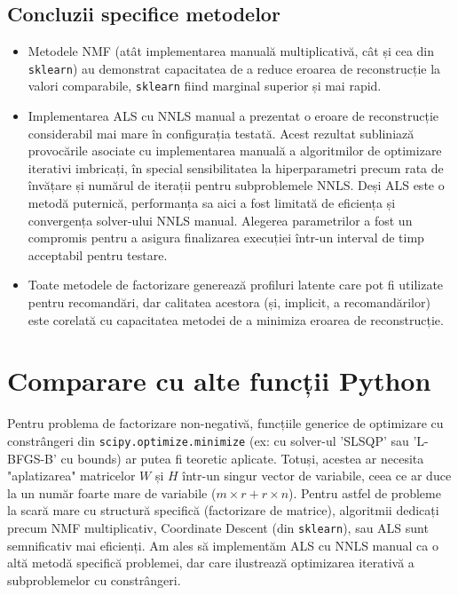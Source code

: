 \documentclass[12pt,a4paper]{article}
\begin{document}
\subsection{Concluzii specifice metodelor}
\begin{itemize}
	\item Metodele NMF (atât implementarea manuală multiplicativă, cât și cea din \texttt{sklearn}) au demonstrat capacitatea de a reduce eroarea de reconstrucție la valori comparabile, \texttt{sklearn} fiind marginal superior și mai rapid.
	\item Implementarea ALS cu NNLS manual a prezentat o eroare de reconstrucție considerabil mai mare în configurația testată. Acest rezultat subliniază provocările asociate cu implementarea manuală a algoritmilor de optimizare iterativi imbricați, în special sensibilitatea la hiperparametri precum rata de învățare și numărul de iterații pentru subproblemele NNLS. Deși ALS este o metodă puternică, performanța sa aici a fost limitată de eficiența și convergența solver-ului NNLS manual. Alegerea parametrilor a fost un compromis pentru a asigura finalizarea execuției într-un interval de timp acceptabil pentru testare.
	\item Toate metodele de factorizare generează profiluri latente care pot fi utilizate pentru recomandări, dar calitatea acestora (și, implicit, a recomandărilor) este corelată cu capacitatea metodei de a minimiza eroarea de reconstrucție.
\end{itemize}

\section{Comparare cu alte funcții Python}
Pentru problema de factorizare non-negativă, funcțiile generice de optimizare cu constrângeri din \texttt{scipy.optimize.minimize} (ex: cu solver-ul 'SLSQP' sau 'L-BFGS-B' cu bounds) ar putea fi teoretic aplicate. Totuși, acestea ar necesita "aplatizarea" matricelor $W$ și $H$ într-un singur vector de variabile, ceea ce ar duce la un număr foarte mare de variabile ($m \times r + r \times n$). Pentru astfel de probleme la scară mare cu structură specifică (factorizare de matrice), algoritmii dedicați precum NMF multiplicativ, Coordinate Descent (din \texttt{sklearn}), sau ALS sunt semnificativ mai eficienți. Am ales să implementăm ALS cu NNLS manual ca o altă metodă specifică problemei, dar care ilustrează optimizarea iterativă a subproblemelor cu constrângeri.
\end{document}
